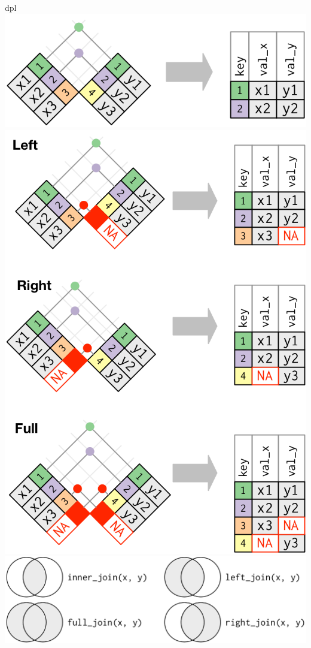 \documentclass[ignorenonframetext,]{beamer}
\begin{document}
\begin{frame}{dpl}
\includegraphics{join-inner.png} \includegraphics{join-outer.png}
\includegraphics{join-venn.png}


\end{frame}
\end{document}
